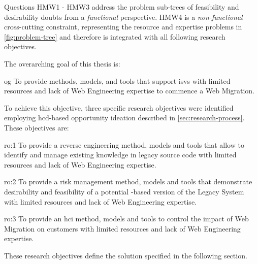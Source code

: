 Questions HMW1 - HMW3 address the problem sub-trees of feasibility and desirability doubts from a \emph{functional} \autocite{ISO/IEEE24765Vocabulary} perspective.
HMW4 is a \emph{non-functional} \autocite{ISO/IEEE24765Vocabulary} cross-cutting constraint, representing the resource and expertise problems in \cref{fig:problem-tree} and therefore is integrated with all following research objectives.

The overarching goal of this thesis is:

\begin{overarchinggoal}{og}
To provide methods, models, and tools that support \glspl{isv} with limited resources and lack of \gls{Web Engineering} expertise to commence a \gls{Web Migration}.
\end{overarchinggoal}

To achieve this objective, three specific research objectives were identified employing \gls{hcd}-based opportunity ideation described in \cref{sec:research-process}.
These objectives are:

\begin{researchobjective}{ro:1}
To provide a reverse engineering method, models and tools that allow to identify and manage existing knowledge in legacy source code with limited resources and lack of \gls{Web Engineering} expertise.
\end{researchobjective}

\begin{researchobjective}{ro:2}
To provide a \gls{risk management} method, models and tools that demonstrate desirability and feasibility of a potential -based version of the \gls{Legacy System} with limited resources and lack of \gls{Web Engineering} expertise.
\end{researchobjective}

\begin{researchobjective}{ro:3}
To provide an \gls{hci} method, models and tools to control the impact of \gls{Web Migration} on customers with limited resources and lack of \gls{Web Engineering} expertise.
\end{researchobjective}

These research objectives define the solution specified in the following section.


